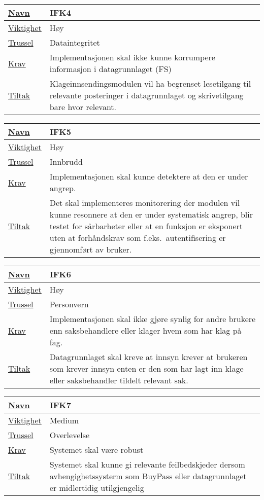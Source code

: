 \begin{tabularx}{\textwidth}{|l|X|}
  \hline
  \underline{Navn} & IFK4 \\ \hline
  \underline{Viktighet} & Høy \\ \hline
  \underline{Trussel} & Dataintegritet \\ \hline
  \underline{Krav} & Implementasjonen skal ikke kunne korrumpere informasjon i datagrunnlaget (FS) \\ \hline
  \underline{Tiltak} & Klageinnsendingsmodulen vil ha begrenset lesetilgang til relevante posteringer i datagrunnlaget og skrivetilgang bare hvor relevant. \\ \hline
\end{tabularx}

\vfill

\begin{tabularx}{\textwidth}{|l|X|}
  \hline
  \underline{Navn} & IFK5 \\ \hline
  \underline{Viktighet} & Høy \\ \hline
  \underline{Trussel} & Innbrudd \\ \hline
  \underline{Krav} & Implementasjonen skal kunne detektere at den er under angrep. \\ \hline
  \underline{Tiltak} & Det skal implementeres monitorering der modulen vil kunne resonnere at den er under systematisk angrep, blir testet for sårbarheter eller at en funksjon er
  eksponert uten at forhåndskrav som f.eks.\ autentifisering er gjennomført av bruker. \\ \hline
\end{tabularx}

\vfill

\begin{tabularx}{\textwidth}{|l|X|}
  \hline
  \underline{Navn} & IFK6 \\ \hline
  \underline{Viktighet} & Høy \\ \hline
  \underline{Trussel} & Personvern \\ \hline
  \underline{Krav} & Implementasjonen skal ikke gjøre synlig for andre brukere enn saksbehandlere eller klager hvem som har klag på fag. \\ \hline
  \underline{Tiltak} & Datagrunnlaget skal kreve at innsyn krever at brukeren som krever innsyn enten er den som har lagt inn klage eller saksbehandler tildelt relevant sak. \\ \hline
\end{tabularx}

\vfill

\begin{tabularx}{\textwidth}{|l|X|}
  \hline
  \underline{Navn} & IFK7 \\ \hline
  \underline{Viktighet} & Medium \\ \hline
  \underline{Trussel} & Overlevelse \\ \hline
  \underline{Krav} & Systemet skal være robust \\ \hline
  \underline{Tiltak} & Systemet skal kunne gi relevante feilbedskjeder dersom avhengighetssysterm som BuyPass eller datagrunnlaget er midlertidig utilgjengelig \\ \hline 
\end{tabularx}

